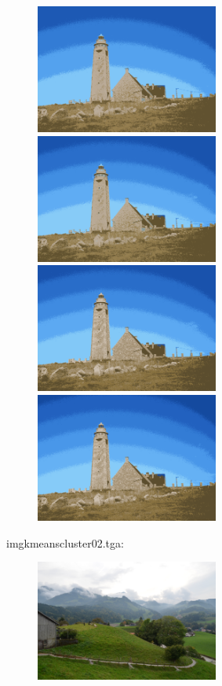\begin{center}
\begin{figure}[H]
\centering\includegraphics[width=6cm]{./imgkmeanscluster01-07.png}\\
\centering\includegraphics[width=6cm]{./imgkmeanscluster01-08.png}
\centering\includegraphics[width=6cm]{./imgkmeanscluster01-09.png}\\
\centering\includegraphics[width=6cm]{./imgkmeanscluster01-10.png}\\
\end{figure}
\end{center}

imgkmeanscluster02.tga:\\
\begin{center}
\begin{figure}[H]
\centering\includegraphics[width=6cm]{./imgkmeanscluster02.png}\\
\end{figure}
\end{center}


